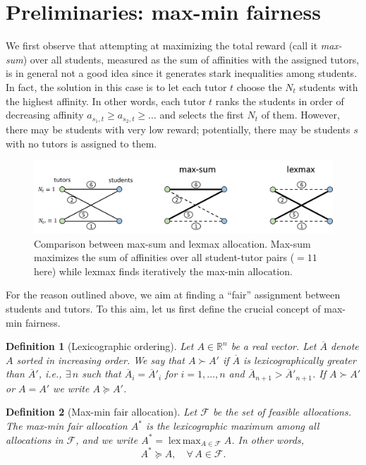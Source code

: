 \documentclass[11pt,oneside,a4paper]{article}     %
\newtheorem{definition}{Definition}
\DeclareMathOperator*{\lexmax}{lex\,max}
\begin{document}
\section{Preliminaries: max-min fairness}

We first observe that attempting at maximizing the total reward (call it \emph{max-sum}) over all students, measured as the sum of affinities with the assigned tutors, is in general not a good idea since it generates stark inequalities among students. In fact, the solution in this case is to let each tutor $t$ choose the $N_t$ students with the highest affinity. In other words, each tutor $t$ ranks the students in order of decreasing affinity $a_{s_1,t}\ge a_{s_2,t} \ge \dots$ and selects the first $N_t$ of them. However, there may be students with very low reward; potentially, there may be students $s$ with no tutors is assigned to them.

\begin{figure}[h!]
\includegraphics[scale=.6]{figs/example.png}
\caption{Comparison between max-sum and lexmax allocation. Max-sum maximizes the sum of affinities over all student-tutor pairs ($=11$ here) while lexmax finds iteratively the max-min allocation.}
\label{fig:example}
\end{figure}


For the reason outlined above, we aim at finding a ``fair'' assignment between students and tutors. To this aim, let us first define the crucial concept of max-min fairness.

\begin{definition}[Lexicographic ordering]
Let $A\in \mathbb{R}^n$ be a real vector. Let $\overline{A}$ denote $A$ sorted in increasing order. We say that $A\succ A'$ if $\overline{A}$ is lexicographically greater than $\overline{A}'$, i.e., $\exists \, n$ such that $\overline{A}_i=\overline{A}'_i$ for $i=1,\dots,n$ and $\overline{A}_{n+1}>\overline{A}'_{n+1}$. If $A\succ A'$ or $A=A'$ we write $A \succeq A'$.
\end{definition}

\begin{definition}[Max-min fair allocation] \cite{nace2008max}
Let $\mathcal F$ be the set of feasible allocations. 
The max-min fair allocation $A^*$ is the lexicographic maximum among all allocations in $\mathcal F$, and we write $A^*=\lexmax_{A\in \mathcal F} A$. In other words,
\[
A^*\succeq A, \quad \forall\, A\in \mathcal F.
\]
\end{definition}
\end{document}
